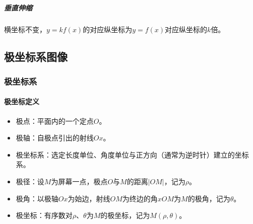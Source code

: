 \documentclass[UTF8, 12pt]{ctexart}
\begin{document}
        \subparagraph{垂直伸缩} \leavevmode \medskip

        \begin{minipage}{0.35\linewidth}
            横坐标不变，$y=kf(x)$的对应纵坐标为$y=f(x)$对应纵坐标的$k$倍。
        \end{minipage}
        \hfill
        \begin{minipage}{0.55\linewidth}
        \end{minipage}

        \subsection{极坐标系图像}
        \subsubsection{极坐标系}

        \paragraph{极坐标定义} \leavevmode \medskip

        \begin{itemize}
            \item 极点：平面内的一个定点$O$。
            \item 极轴：自极点引出的射线$Ox$。
            \item 极坐标系：选定长度单位、角度单位与正方向（通常为逆时针）建立的坐标系。
            \item 极径：设$M$为屏幕一点，极点$O$与$M$的距离$\vert OM\vert$，记为$\rho$。
            \item 极角：以极轴$Ox$为始边，射线$OM$为终边的角$xOM$为$M$的极角，记为$\theta$。
            \item 极坐标：有序数对$\rho$、$\theta$为$M$的极坐标，记为$M(\rho,\theta)$。
        \end{itemize}
\end{document}
